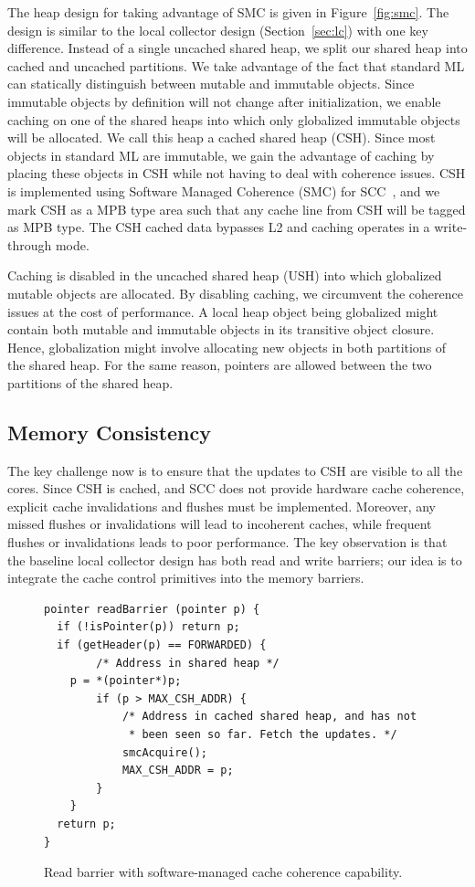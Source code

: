 The heap design for taking advantage of SMC is given in Figure~\ref{fig:smc}.
The design is similar to the local collector design (Section~\ref{sec:lc}) with
one key difference.  Instead of a single uncached shared heap, we split our
shared heap into cached and uncached partitions. We take advantage of the fact
that standard ML can statically distinguish between mutable and immutable
objects. Since immutable objects by definition will not change after
initialization, we enable caching on one of the shared heaps into which only
globalized immutable objects will be allocated. We call this heap a cached
shared heap (CSH). Since most objects in standard ML are immutable, we gain the
advantage of caching by placing these objects in CSH while not having to deal
with coherence issues. CSH is implemented using Software Managed Coherence
(SMC) for SCC~\cite{SMC}, and we mark CSH as a MPB type area such that any
cache line from CSH will be tagged as MPB type. The CSH cached data bypasses L2
and caching operates in a write-through mode.

Caching is disabled in the uncached shared heap (USH) into which globalized
mutable objects are allocated. By disabling caching, we circumvent the
coherence issues at the cost of performance. A local heap object being
globalized might contain both mutable and immutable objects in its transitive
object closure. Hence, globalization might involve allocating new objects in
both partitions of the shared heap. For the same reason, pointers are allowed
between the two partitions of the shared heap.

\subsection{Memory Consistency}

The key challenge now is to ensure that the updates to CSH are visible to all
the cores. Since CSH is cached, and SCC does not provide hardware cache
coherence, explicit cache invalidations and flushes must be implemented.
Moreover, any missed flushes or invalidations will lead to incoherent caches,
while frequent flushes or invalidations leads to poor performance. The key
observation is that the baseline local collector design has both read and write
barriers; our idea is to integrate the cache control primitives into the memory
barriers.

\begin{figure}
\begin{lstlisting}
pointer readBarrier (pointer p) {
  if (!isPointer(p)) return p;
  if (getHeader(p) == FORWARDED) {
		/* Address in shared heap */
    p = *(pointer*)p;
		if (p > MAX_CSH_ADDR) {
			/* Address in cached shared heap, and has not
			 * been seen so far. Fetch the updates. */
			smcAcquire();
			MAX_CSH_ADDR = p;
		}
	}
  return p;
}
\end{lstlisting}
\caption{Read barrier with software-managed cache coherence capability.}
\label{code:read_barrier_smc}
\end{figure}

